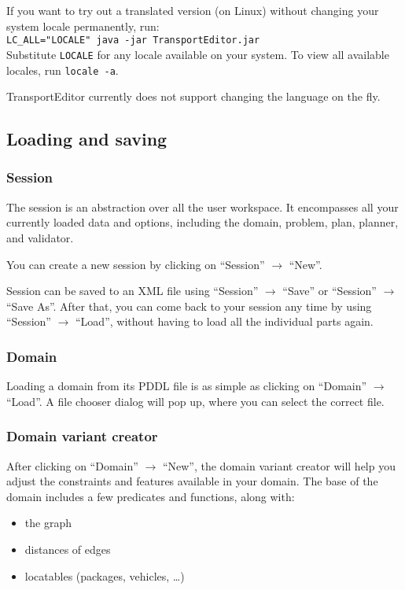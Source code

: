 If you want to try out a translated version (on Linux) without changing your system locale permanently,
run:\\
\verb+LC_ALL="LOCALE" java -jar TransportEditor.jar+\\
Substitute \texttt{LOCALE} for any locale available on your system. To view all available locales,
run \verb+locale -a+.

TransportEditor currently does not support changing the language on the fly.

\subsection*{Loading and saving}
\subsubsection*{Session}
The session is an abstraction over all the user workspace. It encompasses all your currently loaded data and options,
including the domain, problem, plan, planner, and validator.

You can create a new session by clicking on ``Session'' $\to$ ``New''.

Session can be saved to an XML file using ``Session'' $\to$ ``Save'' or ``Session'' $\to$ ``Save As''.
After that, you can come back to your session any time by using ``Session'' $\to$ ``Load'', without
having to load all the individual parts again.

\subsubsection*{Domain}
Loading a domain from its PDDL file is as simple as clicking on ``Domain'' $\to$ ``Load''.
A file chooser dialog will pop up, where you can select the correct file.

\subsubsection*{Domain variant creator}
After clicking on ``Domain'' $\to$ ``New'', the domain variant creator will help
you adjust the constraints and features available in your domain.
The base of the domain includes a few predicates and functions, along with:

\begin{itemize}
\item the graph

\item distances of edges

\item locatables (packages, vehicles, …)
\end{itemize}

